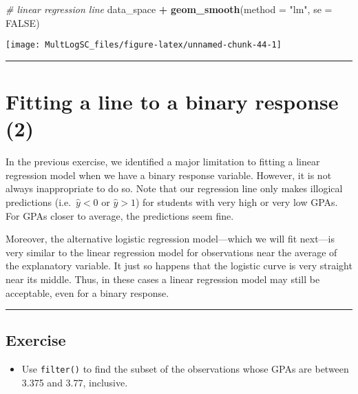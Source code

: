 \documentclass[
]{book}
\newenvironment{Shaded}{\begin{snugshade}}{\end{snugshade}}
\newcommand{\CommentTok}[1]{\textcolor[rgb]{0.56,0.35,0.01}{\textit{#1}}}
\newcommand{\DataTypeTok}[1]{\textcolor[rgb]{0.13,0.29,0.53}{#1}}
\newcommand{\KeywordTok}[1]{\textcolor[rgb]{0.13,0.29,0.53}{\textbf{#1}}}
\newcommand{\NormalTok}[1]{#1}
\newcommand{\OperatorTok}[1]{\textcolor[rgb]{0.81,0.36,0.00}{\textbf{#1}}}
\newcommand{\OtherTok}[1]{\textcolor[rgb]{0.56,0.35,0.01}{#1}}
\newcommand{\StringTok}[1]{\textcolor[rgb]{0.31,0.60,0.02}{#1}}
\providecommand{\tightlist}{%
  \setlength{\itemsep}{0pt}\setlength{\parskip}{0pt}}
\begin{document}
\begin{Shaded}
\begin{Highlighting}[]
\CommentTok{# linear regression line}
\NormalTok{data_space }\OperatorTok{+}\StringTok{ }
\StringTok{  }\KeywordTok{geom_smooth}\NormalTok{(}\DataTypeTok{method =} \StringTok{"lm"}\NormalTok{, }\DataTypeTok{se =} \OtherTok{FALSE}\NormalTok{)}
\end{Highlighting}
\end{Shaded}

\begin{center}\texttt{[image: MultLogSC\_files/figure-latex/unnamed-chunk-44-1]} \end{center}

\begin{center}\rule{0.5\linewidth}{0.5pt}\end{center}

\hypertarget{fitting-a-line-to-a-binary-response-2}{%
\section{Fitting a line to a binary response (2)}\label{fitting-a-line-to-a-binary-response-2}}

In the previous exercise, we identified a major limitation to fitting a linear regression model when we have a binary response variable. However, it is not always inappropriate to do so. Note that our regression line only makes illogical predictions (i.e.~\(\hat{y} < 0\) or \(\hat{y} > 1\)) for students with very high or very low GPAs. For GPAs closer to average, the predictions seem fine.

Moreover, the alternative logistic regression model---which we will fit next---is very similar to the linear regression model for observations near the average of the explanatory variable. It just so happens that the logistic curve is very straight near its middle. Thus, in these cases a linear regression model may still be acceptable, even for a binary response.

\begin{center}\rule{0.5\linewidth}{0.5pt}\end{center}

\hypertarget{exercise-13}{%
\subsection*{Exercise}\label{exercise-13}}

\begin{itemize}
\tightlist
\item
  Use \texttt{filter()} to find the subset of the observations whose GPAs are between 3.375 and 3.77, inclusive.
\end{itemize}
\end{document}

